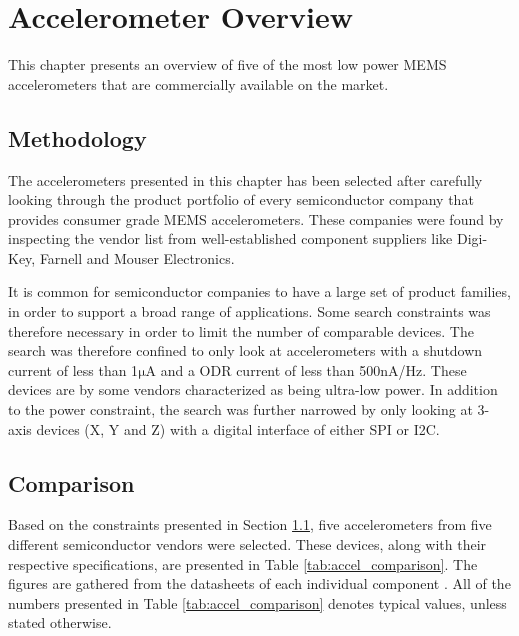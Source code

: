 \chapter{Accelerometer Overview}
\label{chap:overview}

This chapter presents an overview of five of the most low power MEMS accelerometers that are commercially available on the market.

\section{Methodology}
\label{sec:methodology}

The accelerometers presented in this chapter has been selected after carefully looking through the product portfolio of every semiconductor company that provides consumer grade MEMS accelerometers. These companies were found by inspecting the vendor list from well-established component suppliers like Digi-Key, Farnell and Mouser Electronics. 

It is common for semiconductor companies to have a large set of product families, in order to support a broad range of applications. Some search constraints was therefore necessary in order to limit the number of comparable devices. The search was therefore confined to only look at accelerometers with a shutdown current of less than 1$\si{\micro\ampere}$ and a ODR current of less than 500$\si{\nano\ampere}$/Hz. These devices are by some vendors characterized as being ultra-low power. In addition to the power constraint, the search was further narrowed by only looking at 3-axis devices (X, Y and Z) with a digital interface of either SPI or I2C.

\newpage

\section{Comparison}

Based on the constraints presented in Section \ref{sec:methodology}, five accelerometers from five different semiconductor vendors were selected. These devices, along with their respective specifications, are presented in Table \ref{tab:accel_comparison}. The figures are gathered from the datasheets of each individual component \cite{ADXL362, MMA8491Q, MC3610, LIS3DH, KX123}. All of the numbers presented in Table \ref{tab:accel_comparison} denotes typical values, unless stated otherwise. 



